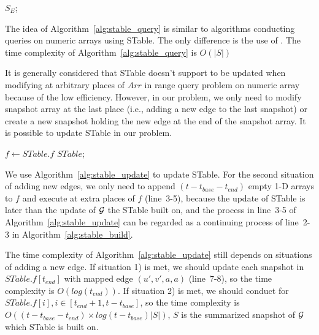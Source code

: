 \documentclass[10pt,journal,compsoc]{IEEEtran}
\begin{document}
{\begin{algorithm}[t]
	\Return $ S_E $;
\end{algorithm}
The idea of Algorithm~\ref{alg:stable_query} is similar to algorithms conducting queries on numeric arrays using STable. The only difference is the use of . The time complexity of Algorithm~\ref{alg:stable_query} is $ O(|S|) $

 It is generally considered that STable doesn't support to be updated when modifying at arbitrary places of $ Arr $ in range query problem on numeric array because of the low efficiency. However, in our problem, we only need to modify snapshot array at the last place (i.e., adding a new edge to the last snapshot) or create a new snapshot holding the new edge at the end of the snapshot array. It is possible to update STable in our problem.
\begin{algorithm}[t]
	\scriptsize
	\caption{$\kw{STable Update}$}
	\label{alg:stable_update}
	$ f \gets STable.f $\;
	\Return $ STable $;
\end{algorithm}

We use Algorithm~\ref{alg:stable_update} to update STable. For the second situation of adding new edges, we only need to append $ (t-t_{base}-t_{end}) $ empty 1-D arrays to $ f $ and execute  at extra places of $ f $ (line~3-5), because the update of STable is later than the update of $ \mathcal{G} $ the STable built on, and the process in line~3-5 of Algorithm~\ref{alg:stable_update} can be regarded as a continuing process of line~2-3 in Algorithm~\ref{alg:stable_build}.

The time complexity of Algorithm~\ref{alg:stable_update} still depends on situations of adding a new edge. If situation 1) is met, we should update each snapshot in $ STable.f[t_{end}] $ with mapped edge $ (u',v',a,a) $ (line~7-8), so the time complexity is $ O(log(t_{end})) $. If situation 2) is met, we should conduct  for $ STable.f[i],i \in [t_{end}+1,t-t_{base}] $, so the time complexity is $ O((t-t_{base}-t_{end})\times log(t-t_{base})|S|) $, $ S $ is the summarized snapshot of $ \mathcal{G} $ which STable is built on.

}
\end{document}
